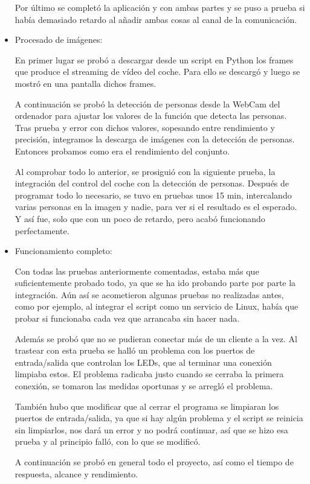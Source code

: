 \documentclass{pclass}
\begin{document}
\begin{itemize}
		Por último se completó la aplicación y con ambas partes y se puso a prueba si había demasiado retardo al añadir ambas cosas al canal de la comunicación.
		
	\item Procesado de imágenes:
	
		En primer lugar se probó a descargar desde un script en Python los frames que produce el streaming de vídeo del coche. Para ello se descargó y luego se mostró en una pantalla dichos frames.
		
		A continuación se probó la detección de personas desde la WebCam del ordenador para ajustar los valores de la función que detecta las personas. Tras prueba y error con dichos valores, sopesando entre rendimiento y precisión, integramos la descarga de imágenes con la detección de personas. Entonces probamos como era el rendimiento del conjunto.
		
		Al comprobar todo lo anterior, se prosiguió con la siguiente prueba, la integración del control del coche con la detección de personas. Después de programar todo lo necesario, se tuvo en pruebas unos 15 min, intercalando varias personas en la imagen y nadie, para ver si el resultado es el esperado. Y así fue, solo que con un poco de retardo, pero acabó funcionando perfectamente. 		
		
		
	
	\item Funcionamiento completo:
	
		Con todas las pruebas anteriormente comentadas, estaba más que suficientemente probado todo, ya que se ha ido probando parte por parte la integración. Aún así se acometieron algunas pruebas no realizadas antes, como por ejemplo, al integrar el script como un servicio de Linux, había que probar si funcionaba cada vez que arrancaba sin hacer nada.
		
		Además se probó que no se pudieran conectar más de un cliente a la vez. Al trastear con esta prueba se halló un problema con los puertos de entrada/salida que controlan los LEDs, que al terminar una conexión limpiaba estos. El problema radicaba justo cuando se cerraba la primera conexión, se tomaron las medidas oportunas y se arregló el problema.
		
		También hubo que modificar que al cerrar el programa se limpiaran los puertos de entrada/salida, ya que si hay algún problema y el script se reinicia sin limpiarlos, nos dará un error y no podrá continuar, así que se hizo esa prueba y al principio falló, con lo que se modificó.
		
		A continuación se probó en general todo el proyecto, así como el tiempo de respuesta, alcance y rendimiento.	
		
	
\end{itemize}
\end{document}

